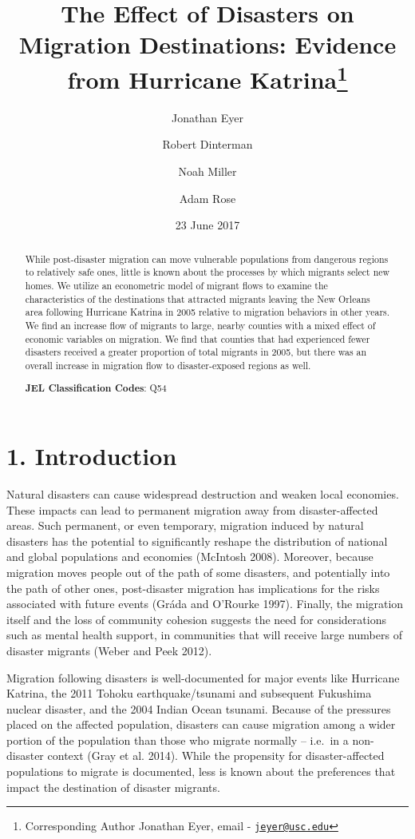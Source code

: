 \documentclass[]{article}
\title{The Effect of Disasters on Migration Destinations: Evidence from
Hurricane Katrina\thanks{Corresponding Author Jonathan Eyer, email -
\href{mailto:jeyer@usc.edu}{\nolinkurl{jeyer@usc.edu}}}}
\author[1]{Jonathan Eyer}
\author[2]{Robert Dinterman}
\author[1]{Noah Miller}
\author[1]{Adam Rose}
\affil[1]{University of Southern California}
\affil[2]{The Ohio State University}
\date{23 June 2017}
\begin{document}
\maketitle

\begin{abstract}
\noindent While post-disaster migration can move vulnerable populations from
dangerous regions to relatively safe ones, little is known about the
processes by which migrants select new homes. We utilize an econometric
model of migrant flows to examine the characteristics of the
destinations that attracted migrants leaving the New Orleans area
following Hurricane Katrina in 2005 relative to migration behaviors in
other years. We find an increase flow of migrants to large, nearby
counties with a mixed effect of economic variables on migration. We find
that counties that had experienced fewer disasters received a greater
proportion of total migrants in 2005, but there was an overall increase
in migration flow to disaster-exposed regions as well.
\vspace{.5cm}

\noindent \textbf{JEL Classification Codes}: Q54
\end{abstract}
\newpage


\newpage

\section{1. Introduction}\label{introduction}


Natural disasters can cause widespread destruction and weaken local
economies. These impacts can lead to permanent migration away from
disaster-affected areas. Such permanent, or even temporary, migration
induced by natural disasters has the potential to significantly reshape
the distribution of national and global populations and economies
(McIntosh 2008). Moreover, because migration moves people out of the
path of some disasters, and potentially into the path of other ones,
post-disaster migration has implications for the risks associated with
future events (Gráda and O'Rourke 1997). Finally, the migration itself
and the loss of community cohesion suggests the need for considerations
such as mental health support, in communities that will receive large
numbers of disaster migrants (Weber and Peek 2012).

Migration following disasters is well-documented for major events like
Hurricane Katrina, the 2011 Tohoku earthquake/tsunami and subsequent
Fukushima nuclear disaster, and the 2004 Indian Ocean tsunami. Because
of the pressures placed on the affected population, disasters can cause
migration among a wider portion of the population than those who migrate
normally -- i.e.~in a non-disaster context (Gray et al. 2014). While the
propensity for disaster-affected populations to migrate is documented,
less is known about the preferences that impact the destination of
disaster migrants.
\end{document}
